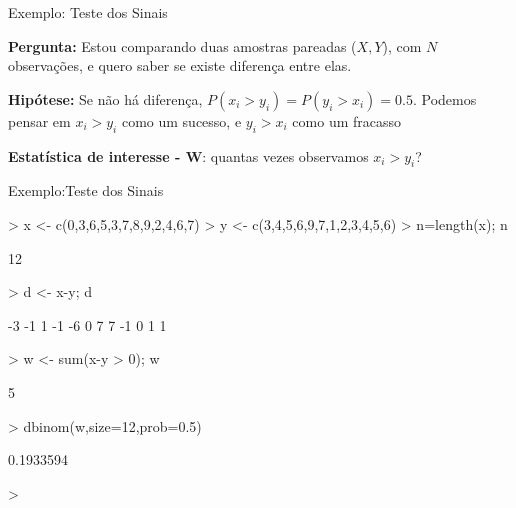 \documentclass{beamer}
\begin{document}
\begin{frame}{Exemplo: Teste dos Sinais}

\textbf{Pergunta:} Estou comparando duas amostras pareadas ($X,Y$), com $N$ observações, e quero saber se existe diferença entre elas.
\medskip

\textbf{Hipótese:} Se não há diferença, $P(x_i > y_i) = P(y_i > x_i) = 0.5$. Podemos pensar em $x_i > y_i$ como um sucesso, e $y_i > x_i$ como um fracasso
\medskip

\textbf{Estatística de interesse - W}: quantas vezes observamos $x_i > y_i$?
\medskip

\medskip



\end{frame} 


\begin{frame}[fragile]{Exemplo:Teste dos Sinais}


\begin{Schunk}
\begin{Sinput}
> x <- c(0,3,6,5,3,7,8,9,2,4,6,7)
> y <- c(3,4,5,6,9,7,1,2,3,4,5,6)
> n=length(x); n
\end{Sinput}
\begin{Soutput}
[1] 12
\end{Soutput}
\begin{Sinput}
> d <- x-y; d
\end{Sinput}
\begin{Soutput}
 [1] -3 -1  1 -1 -6  0  7  7 -1  0  1  1
\end{Soutput}
\begin{Sinput}
> w <- sum(x-y > 0); w
\end{Sinput}
\begin{Soutput}
[1] 5
\end{Soutput}
\begin{Sinput}
> dbinom(w,size=12,prob=0.5)
\end{Sinput}
\begin{Soutput}
[1] 0.1933594
\end{Soutput}
\begin{Sinput}
> 
\end{Sinput}
\end{Schunk}

\end{frame} 
\end{document}
